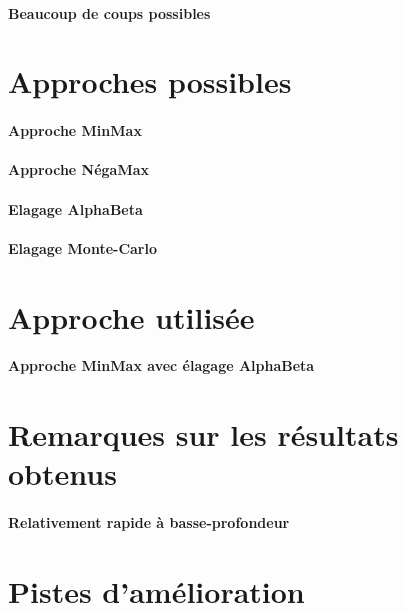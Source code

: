\documentclass{scrreprt}
\begin{document}
    \paragraph{Beaucoup de coups possibles}

    \section{Approches possibles}

    \paragraph{Approche MinMax}

    \paragraph{Approche NégaMax}

    \paragraph{Elagage AlphaBeta}

    \paragraph{Elagage Monte-Carlo}

    \section{Approche utilisée}

    \paragraph{Approche MinMax avec élagage AlphaBeta}

    \section{Remarques sur les résultats obtenus}

    \paragraph{Relativement rapide à basse-profondeur}

    \section{Pistes d'amélioration}
\end{document}

